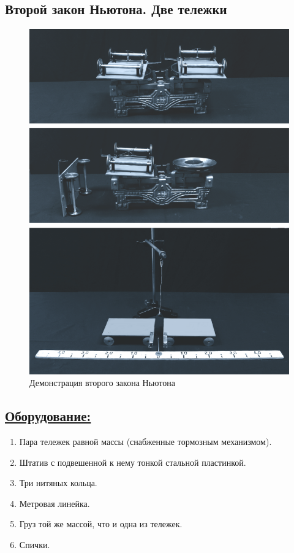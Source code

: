\documentclass[14pt,a4paper,oneside]{extarticle}	%
\begin{document}

\newpage
\begin{center}
	\subsection*{Второй закон Ньютона. Две тележки}
\end{center}

\begin{figure}[H]
	\centering 		
	\includegraphics[width=0.6\linewidth]{newton-1.png}
	\caption{Демонстрация второго закона Ньютона}
	\label{newton-1}
\end{figure}

\subsection*{\underline{Оборудование:}}

\begin{enumerate}
	\item Пара тележек равной массы (снабженные тормозным механизмом).
	\item Штатив с подвешенной к нему тонкой стальной пластинкой.
	\item Три нитяных кольца.
	\item Метровая линейка.
	\item Груз той же массой, что и одна из тележек.
	\item Спички.
\end{enumerate}
\end{document}
